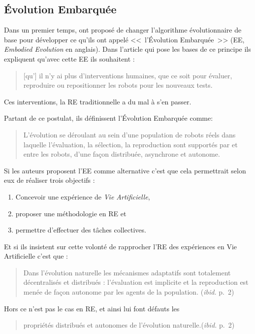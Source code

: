 \subsection{\'Evolution Embarquée}
Dans un premier temps, \cite{watson02embodiedevolutiondistributingevolutionaryalgorithmpopulationrobots} ont proposé de changer l'algorithme évolutionnaire de base pour développer ce qu'ils ont appelé <<~l'\'Evolution Embarquée~>> (EE, \emph{Embodied Evolution} en anglais). Dans l'article qui pose les bases de ce principe ils expliquent qu'avec cette EE ils souhaitent :
\begin{quote}
	[qu'] il n'y ai plus d'interventions humaines, que ce soit pour évaluer, reproduire ou repositionner les robots pour les nouveaux tests.\\
	\citep[p.~1]{watson02embodiedevolutiondistributingevolutionaryalgorithmpopulationrobots}
\end{quote}
Ces interventions, la RE traditionnelle a du mal à s'en passer.

Partant de ce postulat, ils définissent l'\'Evolution Embarquée comme:
\begin{quotation}
	L'évolution se déroulant au sein d'une population de robots réels dans laquelle l'évaluation, la sélection, la reproduction sont supportés par et entre les robots, d'une façon distribuée, asynchrone et autonome.\\
	\citep[p.~2]{watson02embodiedevolutiondistributingevolutionaryalgorithmpopulationrobots}
\end{quotation}

Si les auteurs proposent l'EE comme alternative c'est que cela permettrait selon eux de réaliser trois objectifs :
\begin{enumerate}
\item Concevoir une expérience de \emph{Vie Artificielle},
\item proposer une méthodologie en RE et
\item permettre d'effectuer des tâches collectives.
\end{enumerate}

Et si ils insistent sur cette volonté de rapprocher l'RE des expériences en Vie Artificielle c'est que :
\begin{quote}
	Dans l'évolution naturelle les mécanismes adaptatifs sont totalement décentralisés et distribués : l'évaluation est implicite et la reproduction est menée de façon autonome par les agents de la population. (\emph{ibid.} p.~2)
\end{quote}
Hors ce n'est pas le cas en RE, et ainsi lui font défauts les
\begin{quote}
	propriétés distribués et autonomes de l'évolution naturelle.(\emph{ibid.} p.~2)
\end{quote}

